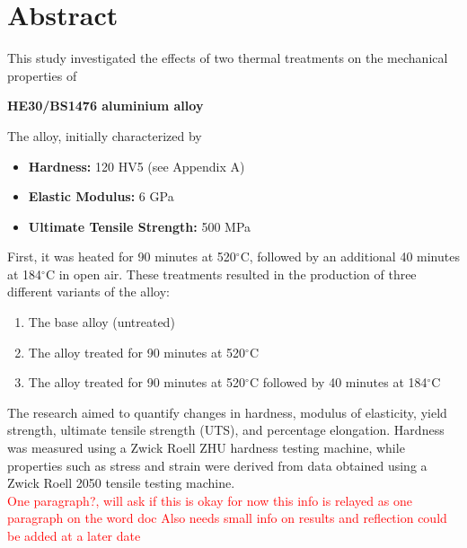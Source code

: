 \documentclass{article}
\begin{document}
    \newpage\vspace*{-20pt}\large

    \section{Abstract}
    \vspace*{1em}
    This study investigated the effects of two thermal treatments on the mechanical properties of 
    \begin{center}
        \textbf{HE30/BS1476 aluminium alloy}
    \end{center}
    The alloy, initially characterized by \\
    \vspace{-0.5em}
    \begin{center}
         \hspace{5em}
         \begin{minipage}{0.6\textwidth}
            \begin{itemize}[itemsep=-1mm]
                \item \textbf{Hardness:} 120 HV5 (see Appendix A)
                \item \textbf{Elastic Modulus:} 6 GPa
                \item \textbf{Ultimate Tensile Strength:} 500 MPa
            \end{itemize} 
        \end{minipage}        
    \end{center}
    \vspace{0.5em}
    First, it was heated for 90 minutes at 520$^\circ$C, followed by an additional 40 minutes at 184$^\circ$C in open air. These treatments resulted in the production of three different variants of the alloy:
    \begin{enumerate}[itemsep=-1mm]
        \item The base alloy (untreated)
        \item The alloy treated for 90 minutes at 520$^\circ$C
        \item The alloy treated for 90 minutes at 520$^\circ$C followed by 40 minutes at 184$^\circ$C
    \end{enumerate}
    The research aimed to quantify changes in hardness, modulus of elasticity, yield strength, ultimate tensile strength (UTS), and percentage elongation. Hardness was measured using a Zwick Roell ZHU hardness testing machine, while properties such as stress and strain were derived from data obtained using a Zwick Roell 2050 tensile testing machine.\\[8pt]
    \textcolor{red}{One paragraph?, will ask if this is okay for now this info is relayed as one paragraph on the word doc}
    \textcolor{red}{Also needs small info on results and reflection could be added at a later date}
   
\end{document}
